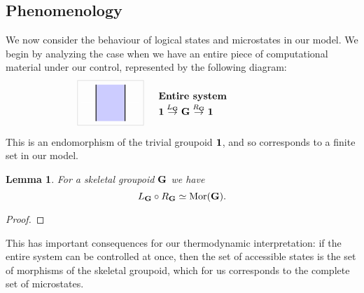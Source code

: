 \documentclass[a4paper,12pt]{article}
\makeatletter
\newtheorem{lemma}[theorem]{Lemma}
\theoremstyle{definition}
\newcommand\cat[1]{{\ensuremath{\bf #1}}}
\renewcommand{\-}[0]{\nobreakdash-\hspace{0pt}}
\newcommand\Mor{\ensuremath{\mathrm{Mor}}}
\newcommand\GB{\ensuremath{R_{\cat G}}}
\newcommand\BG{\ensuremath{L _{\cat G}}}
\newcommand\xto[1]{\ensuremath{\smash{{}\stackrel{\smash{#1}}{\to}{}}}}
\def\syntaxfill{blue!20}
\def\innerboxsep{3pt}
\def\innersep{4pt}
\newcommand\vc[1]{\begin{tabular}{@{}l}#1\end{tabular}}
\newcommand{\centerdia}[1]{\ensuremath{#1}}
\newcommand\newtwocell[3]{\centerdia{\begin{aligned}
\begin{tikzpicture}[scale=1.3]
    #1
    \draw [black!20]
        ([xshift=-\innerboxsep, yshift=-\innerboxsep] current bounding box.south west)
        rectangle
        ([xshift=\innerboxsep, yshift=\innerboxsep] current bounding box.north east);
\end{tikzpicture}
\end{aligned}}
& \hspace{15pt} \makebox[120pt][l]{\bf\vc{#2 \\[\innersep] #3}}}
\makeatother
\begin{document}
\subsection{Phenomenology}
\label{sec:phenomenology}

\noindent
We now consider the behaviour of logical states and microstates in our model. We begin by analyzing the case when we have an entire piece of computational material under our control, represented by the following diagram:
\def\innerboxsep{3pt}
\begin{align*}
\newtwocell{
    \draw [white] (0.2,1) to (1.8,1);
    \draw [fill=\syntaxfill, draw=none] (0.6,0.5)
        to (1.4,0.5) to (1.4,1.5) to (0.6,1.5) to (0.6,0.5);
    \draw [thick] (1.4,0.5) to (1.4,1.5);
    \draw [thick] (0.6,0.5) to (0.6,1.5);
}
{Entire system}
{$\cat 1 \xto \BG \cat G \xto \GB \cat 1$}
\end{align*}
This is an endomorphism of the trivial groupoid \cat 1, and so corresponds to a finite set in our model.
\begin{lemma}
\label{lem:microstates}
For a skeletal groupoid \cat G we have $$\BG \circ \GB \simeq \Mor(\cat G).$$
\end{lemma}
\begin{proof}
\end{proof}

\noindent
This has important consequences for our thermodynamic interpretation: if the entire system can be controlled at once, then the set of accessible states is the set of morphisms of the skeletal groupoid, which for us corresponds to the complete set of microstates.
\end{document}
